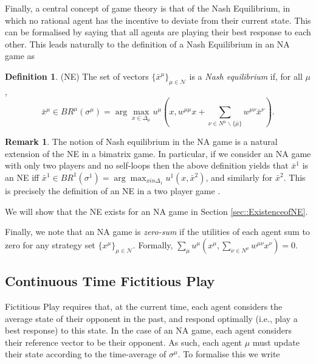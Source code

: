 \documentclass{article}
\theoremstyle{definition}
\newtheorem{definition}{Definition}
\newtheorem*{remark}{Remark}
\newcommand{\agentset}{\mathcal{N}}
\newcommand{\wmunu}{w^{\mu \nu}}
\newcommand{\xmu}{x^{\mu}}
\newcommand{\xnu}{x^{\nu}}
\newcommand{\refmu}{\sigma^{\mu}}
\newcommand{\NE}[1]{\bar{x}^{#1}}
\newcommand{\weightedsum}{ \sum_{\nu \in N^\mu} \wmunu \xnu}
\begin{document}
  Finally, a central concept of game theory is that of the Nash
  Equilibrium, in which no rational agent has the incentive to deviate
  from their current state. This can be formalised by saying that all
  agents are playing their best response to each other.
%
  This leads naturally to the definition of a Nash Equilibrium in an NA game as
%
  \begin{definition}(NE) \label{def::NE}
    The set of vectors $\{ \NE{\mu}\}_{\mu \in \agentset}$ is a {\em
      Nash equilibrium} if, for all $\mu$,
    \begin{equation*}
    \NE{\mu} \in BR^\mu (\refmu) = \arg \max_{x \in \Delta_\mu} u^\mu(x, w^{\mu \mu} x + \sum_{\nu \in N^\mu \backslash \{\bar{\mu}\}} \wmunu \NE{\nu}).
    \end{equation*} 
  \end{definition}
    
  \begin{remark}
The notion of Nash equilibrium in the NA game is a natural
extension of the NE in a bimatrix game.
In particular, if we consider an NA game with only two players and no
self-loops then the above definition yields that $ \NE{1}$ is an NE iff
%
 $     \NE{1} \in BR^1 (\sigma^1) = \arg \max_{x in \Delta_1} u^1 (x, \NE{2})$,
%
    and similarly for $\NE{2}$. This is precisely the definition of an NE in a two player game \cite{}.
  \end{remark}

  We will show that the NE exists for an NA game in Section \ref{sec::ExistenceofNE}. 

  Finally, we note that an NA game is \emph{zero-sum} if the utilities of each agent sum to zero for any strategy set $\{ \xmu \}_{\mu \in \agentset}$. Formally,
%
    $\sum_\mu u^\mu(\xmu, \weightedsum) = 0$.

\subsection{Continuous Time Fictitious Play}
\label{sec::CTFP}

  Fictitious Play requires that, at the current time, each agent
  considers the average state of their opponent in the past, and
  respond optimally (i.e., play a best response) to this state. In the
  case of an NA game, each agent considers their reference vector to
  be their opponent. As such, each agent $\mu$ must update their state
  according to the time-average of $\refmu$. To formalise this we
  write
  
\end{document}
